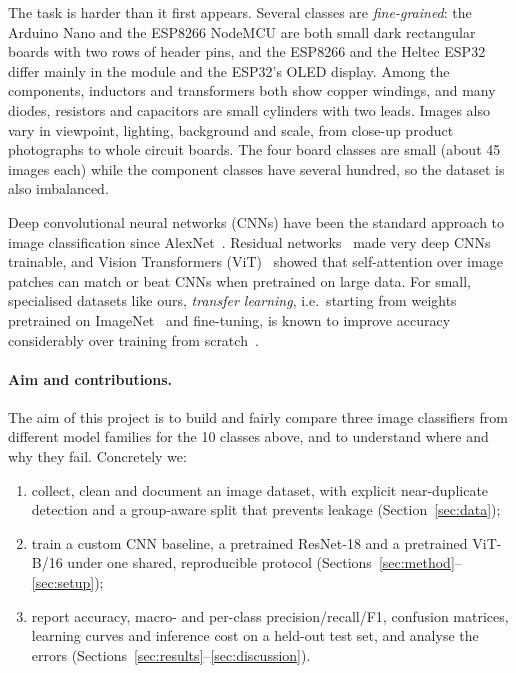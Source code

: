 \documentclass[11pt,a4paper]{article}
\providecommand{\NumClasses}{10}
\begin{document}
The task is harder than it first appears. Several classes are \emph{fine-grained}: the Arduino Nano and the ESP8266 NodeMCU are both small dark rectangular boards with two rows of header pins, and the ESP8266 and the Heltec ESP32 differ mainly in the module and the ESP32's OLED display. Among the components, inductors and transformers both show copper windings, and many diodes, resistors and capacitors are small cylinders with two leads. Images also vary in viewpoint, lighting, background and scale, from close-up product photographs to whole circuit boards. The four board classes are small (about 45 images each) while the component classes have several hundred, so the dataset is also imbalanced.

Deep convolutional neural networks (CNNs) have been the standard approach to image classification since AlexNet~\cite{krizhevsky2012}. Residual networks~\cite{he2016} made very deep CNNs trainable, and Vision Transformers (ViT)~\cite{dosovitskiy2021} showed that self-attention over image patches can match or beat CNNs when pretrained on large data. For small, specialised datasets like ours, \emph{transfer learning}, i.e.\ starting from weights pretrained on ImageNet~\cite{deng2009} and fine-tuning, is known to improve accuracy considerably over training from scratch~\cite{yosinski2014,kornblith2019}.

\paragraph{Aim and contributions.} The aim of this project is to build and fairly compare three image classifiers from different model families for the \NumClasses{} classes above, and to understand where and why they fail. Concretely we:
\begin{enumerate}
  \item collect, clean and document an image dataset, with explicit near-duplicate detection and a group-aware split that prevents leakage (Section~\ref{sec:data});
  \item train a custom CNN baseline, a pretrained ResNet-18 and a pretrained ViT-B/16 under one shared, reproducible protocol (Sections~\ref{sec:method}--\ref{sec:setup});
  \item report accuracy, macro- and per-class precision/recall/F1, confusion matrices, learning curves and inference cost on a held-out test set, and analyse the errors (Sections~\ref{sec:results}--\ref{sec:discussion}).
\end{enumerate}
\end{document}
